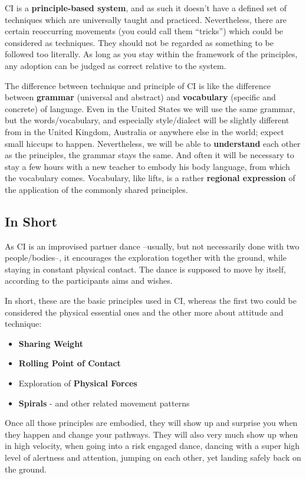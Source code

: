 CI is a \textbf{principle-based system}, and as such it doesn't have a defined set of techniques which are universally taught and practiced.
Nevertheless, there are certain reoccurring movements (you could call them ``tricks'') which could be considered as techniques.
They should not be regarded as something to be followed too literally.
As long as you stay within the framework of the principles, any adoption can be judged as correct relative to the system.

The difference between technique and principle of CI is like the difference between \textbf{grammar} (universal and abstract) and \textbf{vocabulary} (specific and concrete) of language.
Even in the United States we will use the same grammar, but the words/vocabulary, and especially style/dialect will be slightly different from in the United Kingdom, Australia or anywhere else in the world; expect small hiccups to happen.
Nevertheless, we will be able to \textbf{understand} each other as the principles, the grammar stays the same.
And often it will be necessary to stay a few hours with a new teacher to embody his body language, from which the vocabulary comes.
Vocabulary, like lifts, is a rather \textbf{regional expression} of the application of the commonly shared principles.


\subsection{In Short}\label{subsec:in-short}

As CI is an improvised partner dance --usually, but not necessarily done with two people/bodies--, it encourages the exploration together with the ground, while staying in constant physical contact.
The dance is supposed to move by itself, according to the participants aims and wishes.

In short, these are the basic principles used in CI, whereas the first two could be considered the physical essential ones and the other more about attitude and technique:

\begin{itemize}
    \setlength\itemsep{0em}
    \item \textbf{Sharing Weight}
    \item \textbf{Rolling Point of Contact}
    \item Exploration of \textbf{Physical Forces}
    \item \textbf{Spirals} - and other related movement patterns
\end{itemize}

Once all those principles are embodied, they will show up and surprise you when they happen and change your pathways.
They will also very much show up when in high velocity, when going into a risk engaged dance, dancing with a super high level of alertness and attention, jumping on each other, yet landing safely back on the ground.
